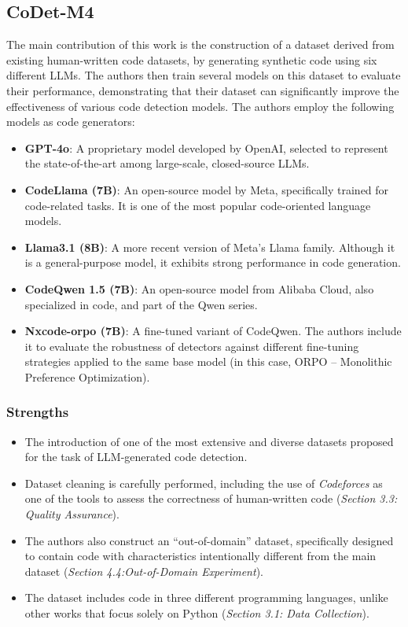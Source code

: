 \subsection{CoDet-M4}
The main contribution of this work is the construction 
of a dataset derived from existing human-written code datasets, 
by generating synthetic code using six different LLMs. 
The authors then train several models on this dataset 
to evaluate their performance, 
demonstrating that their dataset can significantly improve 
the effectiveness of various code detection models.
The authors employ the following models as code generators:

\begin{itemize}
    \item \textbf{GPT-4o}: A proprietary model developed by OpenAI, selected to represent the state-of-the-art among large-scale, closed-source LLMs.
    
    \item \textbf{CodeLlama (7B)}: An open-source model by Meta, specifically trained for code-related tasks. It is one of the most popular code-oriented language models.
    
    \item \textbf{Llama3.1 (8B)}: A more recent version of Meta’s Llama family. Although it is a general-purpose model, it exhibits strong performance in code generation.
    
    \item \textbf{CodeQwen 1.5 (7B)}: An open-source model from Alibaba Cloud, also specialized in code, and part of the Qwen series.
    
    \item \textbf{Nxcode-orpo (7B)}: A fine-tuned variant of CodeQwen. The authors include it to evaluate the robustness of detectors against different fine-tuning strategies applied to the same base model (in this case, ORPO – Monolithic Preference Optimization).
\end{itemize}


\subsubsection*{Strengths}
\begin{itemize}
    \item The introduction of one of the most extensive and diverse datasets proposed for the task of LLM-generated code detection.
    \item Dataset cleaning is carefully performed, including the use of \textit{Codeforces} as one of the tools to assess the correctness of human-written code {(\scriptsize\textit{Section 3.3: Quality Assurance})}.
    \item The authors also construct an ``out-of-domain'' dataset, specifically designed to contain code with characteristics intentionally different from the main dataset {(\scriptsize\textit{Section 4.4:Out-of-Domain Experiment})}.
    \item The dataset includes code in three different programming languages, unlike other works that focus solely on Python {(\scriptsize\textit{Section 3.1: Data Collection})}.
\end{itemize}

